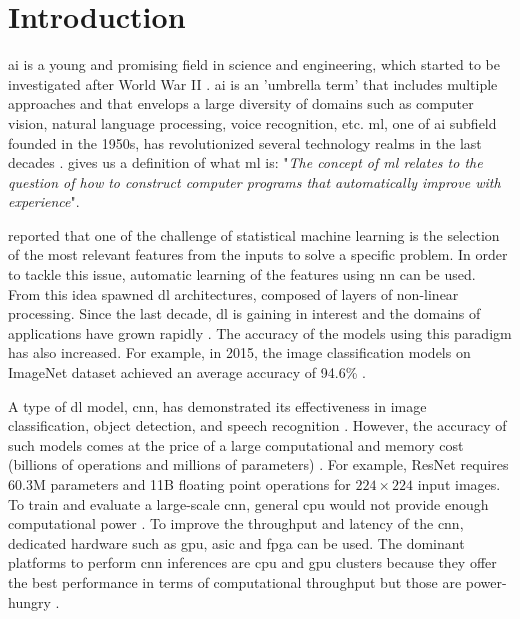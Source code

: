 \chapter{Introduction} \label{chap:intr}
%
%
\acrfull{ai} is a young and promising field in science and engineering, which started to be investigated after World War II \cite{russell_artificial_2009}. \acrshort{ai} is an 'umbrella term' that includes multiple approaches and that envelops a large diversity of domains such as computer vision, natural language processing, voice recognition, etc.
\acrfull{ml}, one of \acrshort{ai} subfield founded in the 1950s, has revolutionized several technology realms in the last decades \cite{alom_history_2018}. \textcite{mitchell_machine_1997} gives us a definition of what \acrshort{ml} is: "\textit{The concept of \acrshort{ml} relates to the question of how to construct computer programs that automatically improve with experience}".

\textcite{arnold_introduction_2011} reported that one of the challenge of statistical machine learning is the selection of the most relevant features from the inputs to solve a specific problem. In order to tackle this issue, automatic learning of the features using \acrfull{nn} can be used. From this idea spawned \acrfull{dl} architectures, composed of layers of non-linear processing. Since the last decade, \acrshort{dl} is gaining in interest and the domains of applications have grown rapidly \cite{wason_deep_2018}. The accuracy of the models using this paradigm has also increased. For example, in 2015, the image classification models on ImageNet dataset achieved an average accuracy of 94.6\% \cite{russakovsky_imagenet_2015}.

A type of \acrshort{dl} model, \acrfull{cnn}, has demonstrated its effectiveness in image classiﬁcation, object detection, and speech recognition \cite{shawahna_fpga-based_2019}. However, the accuracy of such models comes at the price of a large computational and memory cost (billions of operations and millions of parameters) \cite{szegedy_going_2014}. For example, ResNet \cite{he_deep_2015} requires 60.3M parameters and 11B floating point operations for $224 \times 224$ input images. To train and evaluate a large-scale \acrshort{cnn}, general \acrfull{cpu} would not provide enough computational power \cite{liu_fpga-based_2019}. To improve the throughput and latency of the \acrshort{cnn}, dedicated hardware such as \acrfull{gpu}, \acrfull{asic} and \acrfull{fpga} can be used. The dominant platforms to perform \acrshort{cnn} inferences are \acrshort{cpu} and \acrshort{gpu} clusters because they offer the best performance in terms of computational throughput but those are power-hungry \cite{liu_uniform_2019}.

